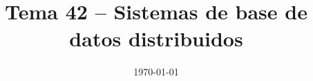 \documentclass[12pt]{report}
\title{\textbf{Tema 42 – Sistemas de base de datos distribuidos}}
\author{}
\date{\today}
\begin{document}
\maketitle
\tableofcontents
\bigskip









\end{document}
